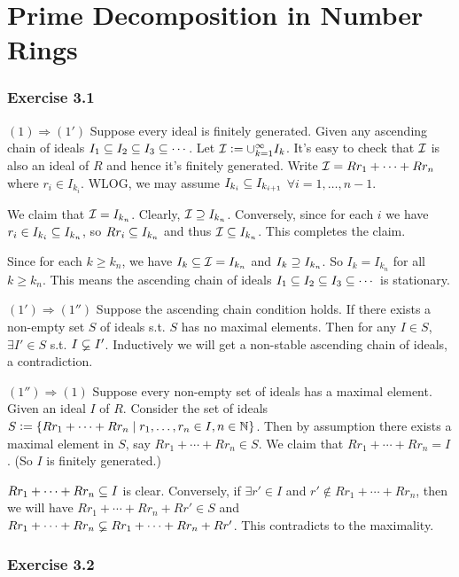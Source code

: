 \documentclass[../Marcus.tex]{subfiles}
\begin{document}
\chapter{Prime Decomposition in Number Rings}

\subsection*{Exercise 3.1}

$(1)\Rightarrow(1')$ Suppose every ideal is finitely generated. Given any ascending chain of ideals $I_1\subseteq I_2\subseteq I_3\subseteq\cdots$. Let $\mathcal{I}:=\cup_{k=1}^\infty I_k$. It's easy to check that $\mathcal{I}$ is also an ideal of $R$ and hence it's finitely generated. Write $\mathcal{I}=Rr_1+\cdots+Rr_n$ where $r_i\in I_{k_i}$. WLOG, we may assume $I_{k_i}\subseteq I_{k_{i+1}}$ $\forall i=1,\ldots,n-1$. 

We claim that $\mathcal{I}=I_{k_n}$. Clearly, $\mathcal{I}\supseteq I_{k_n}$. Conversely, since for each $i$ we have $r_i\in I_{k_i}\subseteq I_{k_n}$, so $Rr_i\subseteq I_{k_n}$ and thus $\mathcal{I}\subseteq I_{k_n}$. This completes the claim.

Since for each $k\geq k_n$, we have $I_k\subseteq \mathcal{I}=I_{k_n}$ and $I_k\supseteq I_{k_n}$. So $I_k=I_{k_n}$ for all $k\geq k_n$. This means the ascending chain of ideals $I_1\subseteq I_2\subseteq I_3\subseteq\cdots$ is stationary.

$(1')\Rightarrow(1'')$ Suppose the ascending chain condition holds. If there exists a non-empty set $S$ of ideals s.t. $S$ has no maximal elements. Then for any $I\in S$, $\exists I'\in S$ s.t. $I\varsubsetneq I'$. Inductively we will get a non-stable ascending chain of ideals, a contradiction.

$(1'')\Rightarrow(1)$ Suppose every non-empty set of ideals has a maximal element. Given an ideal $I$ of $R$. Consider the set of ideals $S:=\{Rr_1+\cdots+Rr_n\mid r_1,\ldots,r_n\in I, n\in\mathbb{N}\}$. Then by assumption there exists a maximal element in $S$, say $Rr_1+\cdots+Rr_n \in S$. We claim that $Rr_1+\cdots+Rr_n=I$. (So $I$ is finitely generated.)

$Rr_1+\cdots+Rr_n\subseteq I$ is clear. Conversely, if $\exists r'\in I$ and $r'\notin Rr_1+\cdots+Rr_n$, then we will have $Rr_1+\cdots+Rr_n+Rr' \in S$ and $Rr_1+\cdots+Rr_n \varsubsetneq Rr_1+\cdots+Rr_n+Rr'$. This contradicts to the maximality.

\subsection*{Exercise 3.2}
\end{document}
